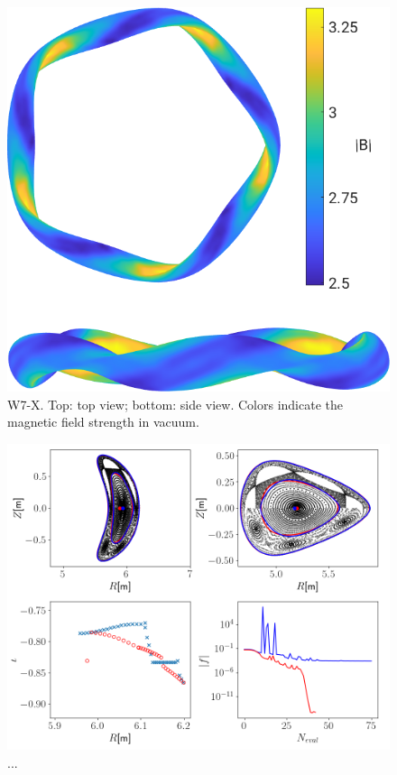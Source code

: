 \documentclass[my_thesis.tex]{subfiles}
\begin{document}
\begin{figure}
	\centering
	\includegraphics[width=.8\linewidth]{images/HennebergRepresentation/W7X_modB_boundary.png}
	\caption{W7-X. Top: top view; bottom: side view. Colors indicate the magnetic field strength in vacuum.}
	\label{fig. w7x_geometry}
\end{figure}

\begin{figure}
	\centering
	\includegraphics[width=\linewidth]{images/HennebergRepresentation/W7X_Nvol2.png}
	\caption{...}
	\label{fig. w7x_henneberg representation_results}
\end{figure}
\end{document}
